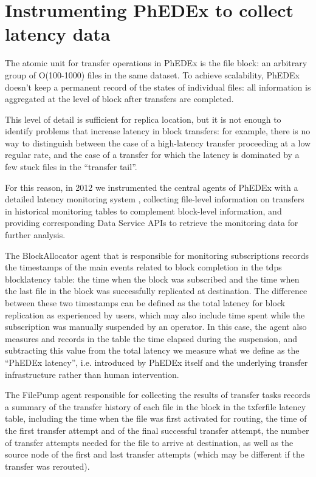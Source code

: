 \section{Instrumenting PhEDEx to collect latency data}
\label{sec:instrumenting}

The atomic unit for transfer operations in PhEDEx is the file block:
an arbitrary group of O(100-1000) files in the same dataset.  To
achieve scalability, PhEDEx doesn't keep a permanent record of the
states of individual files: all information is aggregated at the level
of block after transfers are completed.

This level of detail is sufficient for replica location, but it is not
enough to identify problems that increase latency in block transfers:
for example, there is no way to distinguish between the case of a
high-latency transfer proceeding at a low regular rate, and the case
of a transfer for which the latency is dominated by a few stuck files
in the ``transfer tail''.

For this reason, in 2012 we instrumented the central agents of PhEDEx
with a detailed latency monitoring system \cite{phedexlatency},
collecting file-level information on transfers in historical
monitoring tables to complement block-level information, and providing
corresponding Data Service APIs to retrieve the monitoring data for
further analysis.

The BlockAllocator agent that is responsible for monitoring
subscriptions records the timestamps of the main events related to
block completion in the t\textunderscore dps\textunderscore
block\textunderscore latency table: the time when the block was
subscribed and the time when the last file in the block was
successfully replicated at destination.  The difference between these
two timestamps can be defined as the total latency for block
replication as experienced by users, which may also include time spent
while the subscription was manually suspended by an operator.  In this
case, the agent also measures and records in the table the time
elapsed during the suspension, and subtracting this value from the
total latency we measure what we define as the ``PhEDEx latency'',
i.e. introduced by PhEDEx itself and the underlying transfer
infrastructure rather than human intervention.


The FilePump agent responsible for collecting the results of transfer
tasks records a summary of the transfer history of each file in the
block in the t\textunderscore xfer\textunderscore file\textunderscore
latency table, including the time when the file was first activated
for routing, the time of the first transfer attempt and of the final
successful transfer attempt, the number of transfer attempts needed
for the file to arrive at destination, as well as the source node of
the first and last transfer attempts (which may be different if the
transfer was rerouted).



